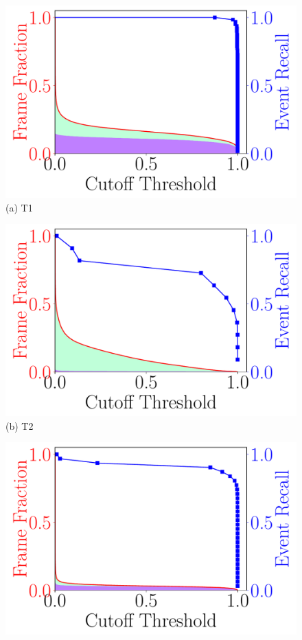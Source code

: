 \begin{figure}
\begin{minipage}[]{0.45\linewidth}
\centering
\includegraphics[width=\linewidth]{FIGS/fig-event-recall-frame-percentage-vs-threshold-okutama.pdf}\\
{(a) T1}
\end{minipage}
\begin{minipage}[]{0.45\linewidth}
\centering
    \includegraphics[width=\linewidth]{FIGS/fig-event-recall-frame-percentage-vs-threshold-stanford.pdf}\\
{(b) T2}
\end{minipage}
\begin{minipage}[]{0.45\linewidth}
\centering
    \includegraphics[width=\linewidth]{FIGS/fig-event-recall-frame-percentage-vs-threshold-raft.pdf}\\

\end{minipage}
\end{figure}
